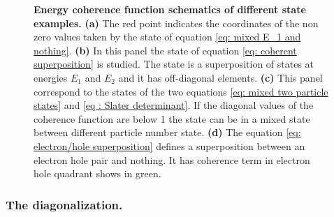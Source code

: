\begin{figure}[hptb]
\begin{center}
\begin{tabular}{c c c c}
		\end{tabular} 
	\end{center}
	\caption{\textbf{Energy coherence function schematics of different state examples.} \textbf{(a)} The red point indicates the coordinates of the non zero values taken by the state of equation \eqref{eq: mixed E_1 and nothing}. \textbf{(b)} In this panel the state of equation \eqref{eq: coherent superposition} is studied. The state is a superposition of states at energies $E_{1}$ and $E_{2}$ and it has off-diagonal elements. \textbf{(c)} This panel correspond to the states of the two equations \eqref{eq: mixed two particle states} and \eqref{eq : Slater determinant}. If the diagonal values of the coherence function are below 1 the state can be in a mixed state between different particle number state. \textbf{(d)} The equation \eqref{eq: electron/hole superposition} defines a superposition between an electron hole pair and nothing. It has coherence term in electron hole quadrant shows in green.}
	\label{fig: schema Glauber examples}
\end{figure}

\subsubsection*{The diagonalization.}

